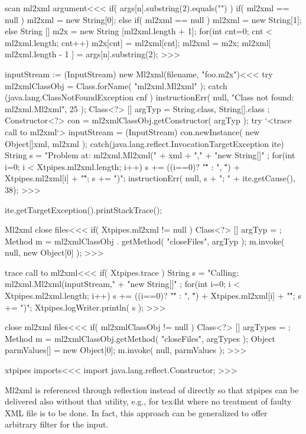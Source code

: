 \documentclass{article}
\begin{document}
\<scan ml2xml argument\><<<
if( args[n].substring(2).equals("") ){
   if( ml2xml == null ){ ml2xml = new String[0]; }
} else {
   if( ml2xml == null ){
      ml2xml = new String[1];
   } else {
      String [] m2x = new String [ml2xml.length + 1];
      for(int cnt=0; cnt < ml2xml.length; cnt++){
        m2x[cnt] = ml2xml[cnt];
      }  
      ml2xml = m2x;
   }
   ml2xml[ ml2xml.length - 1 ] = args[n].substring(2);
}
>>>


\<inputStream := (InputStream) new Ml2xml(filename, "foo.m2x")\><<<
try{
   ml2xmlClassObj = Class.forName( "ml2xml.Ml2xml" );
} catch (java.lang.ClassNotFoundException cnf ){
   instructionErr( null, "Class not found: ml2xml.Ml2xml", 25 ); 
}
Class<?> [] argTyp = { String.class, String[].class }; 
Constructor<?> con = ml2xmlClassObj.getConstructor( argTyp ); 
try{
   `<trace call to ml2xml`>
   inputStream = (InputStream) con.newInstance( 
         new Object[]{xml, ml2xml}
      ); 
} catch(java.lang.reflect.InvocationTargetException ite){
   String s = "Problem at: ml2xml.Ml2xml(" + xml + ","
              + "new String[]{" ;
   for(int i=0; i < Xtpipes.ml2xml.length; i++){
      s += ((i==0)? "\"" : ", \"") + Xtpipes.ml2xml[i] + "\"";
   }
   s += "})";          
   instructionErr( null, s + "; " + ite.getCause(), 38); 
}
>>>

 ite.getTargetException().printStackTrace();


\<Ml2xml close files\><<<
if( Xtpipes.ml2xml != null ){
   Class<?> [] argTyp = {}; 
   Method m = ml2xmlClassObj . getMethod( "closeFiles", argTyp ); 
   m.invoke( null, new Object[0] ); 
}  
>>>

\<trace call to ml2xml\><<<
if( Xtpipes.trace ){
   String s = "Calling: ml2xml.Ml2xml(inputStream,"
              + "new String[]{" ;
   for(int i=0; i < Xtpipes.ml2xml.length; i++){
      s += ((i==0)? "\"" : ", \"") + Xtpipes.ml2xml[i] + "\"";
   }
   s += "})";          
   Xtpipes.logWriter.println( s );      
}
>>>


\<close ml2xml files\><<<
if( ml2xmlClassObj != null ){
  Class<?> [] argTypes = { }; 
  Method m = ml2xmlClassObj.getMethod( "closeFiles", argTypes ); 
  Object parmValues[] = new Object[0]; 
  m.invoke( null, parmValues ); 
}
>>>


\<xtpipes imports\><<<
import java.lang.reflect.Constructor;
>>>

Ml2xml is referenced through reflection instead of directly so that xtpipes can
be delivered also without that utility, e.g., for tex4ht where no treatment of faulty 
XML file is to be done. In fact, this approach can be generalized to offer 
arbitrary filter for the input.
\end{document}
